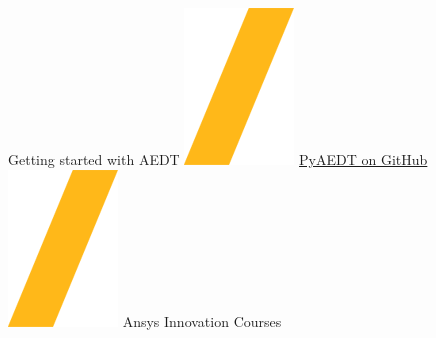 \documentclass[9pt,landscape]{article}
\begin{document}
\begin{center}
Getting started with AEDT \includegraphics[height=\fontcharht\font`\S]{slash.png} \href{https://github.com/ansys/pyaedt}{{\color{blue}PyAEDT on GitHub}} \includegraphics[height=\fontcharht\font`\S]{slash.png} Ansys Innovation Courses %
\end{center}
\end{document}

